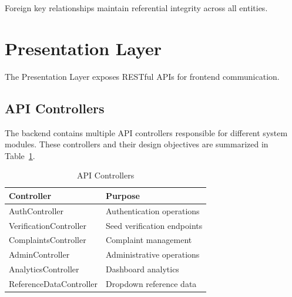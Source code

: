Foreign key relationships maintain referential integrity across all entities.

\section{Presentation Layer}
\label{sec:presentation-layer}

The Presentation Layer exposes RESTful APIs for frontend communication.

\subsection{API Controllers}

The backend contains multiple API controllers responsible for different system modules. These controllers and their design objectives are summarized in Table~\ref{tab:api-controllers}.

\begin{table}[H]
\centering
\caption{API Controllers}
\label{tab:api-controllers}
\renewcommand{\arraystretch}{1.3}

\begin{tabularx}{0.95\textwidth}{|p{4cm}|X|}
\hline
\textbf{Controller} & \textbf{Purpose} \\
\hline

AuthController & Authentication operations \\

\hline

VerificationController & Seed verification endpoints \\

\hline

ComplaintsController & Complaint management \\

\hline

AdminController & Administrative operations \\

\hline

AnalyticsController & Dashboard analytics \\

\hline

ReferenceDataController & Dropdown reference data \\

\hline

\end{tabularx}

\end{table}

